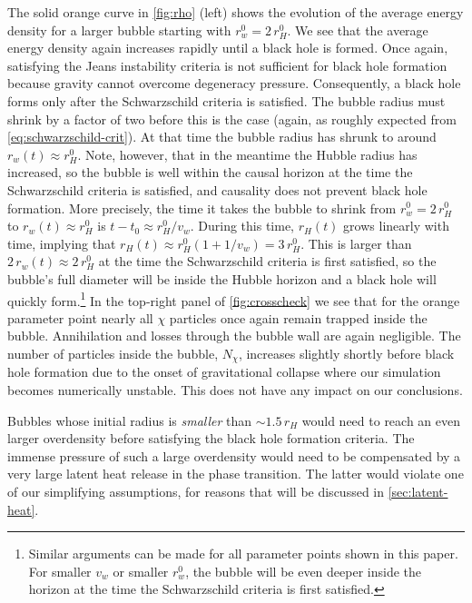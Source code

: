 \documentclass[
onecolumn, %
11pt, %
tightenlines,
superscriptaddress, %
nofootinbib, %
preprintnumbers, %
prd %
]{revtex4-1}
\begin{document}
The solid orange curve in \cref{fig:rho} (left) shows the evolution of the average energy density for a larger bubble starting with $r_w^0 = 2\,r_H^0$. We see that the average energy density again increases rapidly until a black hole is formed. Once again, satisfying the Jeans instability criteria is not sufficient for black hole formation because gravity cannot overcome degeneracy pressure. Consequently, a black hole forms only after the Schwarzschild criteria is satisfied. The bubble radius must shrink by a factor of two before this is the case (again, as roughly expected from \cref{eq:schwarzschild-crit}). At that time the bubble radius has shrunk to around $r_w(t) \approx r_H^0$. Note, however, that in the meantime the Hubble radius has increased, so the bubble is well within the causal horizon at the time the Schwarzschild criteria is satisfied, and causality does not prevent black hole formation. More precisely, the time it takes the bubble to shrink from $r_w^0 = 2\,r_H^0$ to $r_w(t) \approx r_H^0$ is $t - t_0 \approx r_H^0 / v_w$. During this time, $r_H(t)$ grows linearly with time, implying that $r_H(t) \approx r_H^0 (1 + 1/v_w) = 3\,r_H^0$. This is larger than $2\,r_w(t) \approx 2\,r_H^0$ at the time the Schwarzschild criteria is first satisfied, so the bubble's full diameter will be inside the Hubble horizon and a black hole will quickly form.\footnote{Similar arguments can be made for all parameter points shown in this paper. For smaller $v_w$ or smaller $r_w^0$, the bubble will be even deeper inside the horizon at the time the Schwarzschild criteria is first satisfied.} In the top-right panel of \cref{fig:crosscheck} we see that for the orange parameter point nearly all $\chi$ particles once again remain trapped inside the bubble. Annihilation and losses through the bubble wall are again negligible.  The number of particles inside the bubble, $N_\chi$, increases slightly shortly before black hole formation due to the onset of gravitational collapse where our simulation becomes numerically unstable.  This does not have any impact on our conclusions.  

Bubbles whose initial radius is \emph{smaller} than $\sim 1.5\,r_H$ would need to reach an even larger overdensity before satisfying the black hole formation criteria. The immense pressure of such a large overdensity would need to be compensated by a very large latent heat release in the phase transition. The latter would violate one of our simplifying assumptions, for reasons that will be discussed in \cref{sec:latent-heat}.
\end{document}
